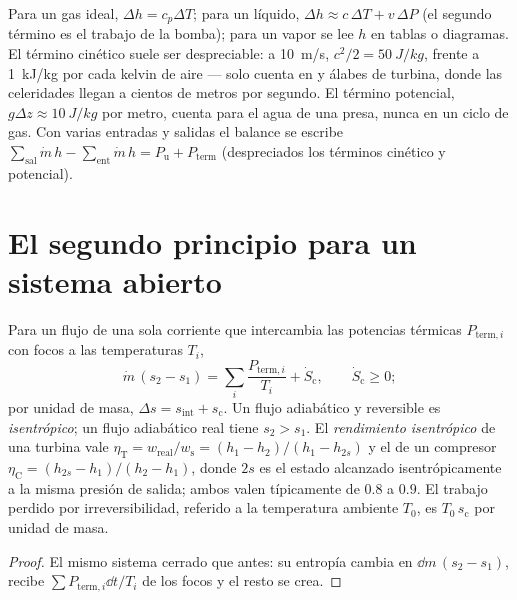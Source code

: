 \begin{remark}\label{rem:b2:open-systems:using}
Para un gas ideal, $\Delta h = c_p\Delta T$; para un líquido, $\Delta h \approx
c\,\Delta T + v\,\Delta P$ (el segundo término es el trabajo de la bomba); para un vapor
se lee $h$ en tablas o diagramas. El término cinético suele ser
despreciable: a \qty{10}{m/s}, $c^2/2 = \qty{50}{J/kg}$, frente a
\qty{1}{kJ/kg} por cada kelvin de aire --- solo cuenta en  y
álabes de turbina, donde las celeridades llegan a cientos de metros por segundo. El
término potencial, $g\Delta z \approx \qty{10}{J/kg}$ por metro, cuenta para el
agua de una presa, nunca en un ciclo de gas. Con varias entradas y salidas
el balance se escribe $\sum_{\text{sal}}\dot m\,h - \sum_{\text{ent}}\dot m\,h =
P_{\text{u}} + P_{\text{term}}$ (despreciados los términos cinético y potencial).
\end{remark}

\section{El segundo principio para un sistema abierto}

\begin{theorem}\label{thm:b2:open-systems:secondlaw}
Para un flujo  de una sola corriente que intercambia las potencias térmicas
$P_{\text{term},i}$ con focos a las temperaturas $T_i$,
\[
\dot m\,(s_2 - s_1) = \sum_i\frac{P_{\text{term},i}}{T_i} + \dot S_{\text{c}},
\qquad \dot S_{\text{c}} \ge 0 ;
\]
por unidad de masa, $\Delta s = s_{\text{int}} + s_{\text{c}}$. Un flujo adiabático
y reversible es \emph{isentrópico}; un flujo adiabático real tiene $s_2 >
s_1$. El \emph{rendimiento isentrópico} de
una turbina vale $\eta_{\text{T}} = w_{\text{real}}/w_{\text{s}} = (h_1 - h_2)/(h_1
- h_{2s})$ y el de un compresor $\eta_{\text{C}} = (h_{2s} - h_1)/(h_2 -
h_1)$, donde $2s$ es el estado alcanzado isentrópicamente a la misma
presión de salida; ambos valen típicamente de $0.8$ a $0.9$. El trabajo perdido por
irreversibilidad, referido a la temperatura ambiente $T_0$, es
$T_0\,s_{\text{c}}$ por unidad de masa.
\end{theorem}

\begin{proof}
El mismo sistema cerrado que antes: su entropía cambia en $\dd m\,(s_2 -
s_1)$, recibe $\sum P_{\text{term},i}\dd t/T_i$ de los focos y el
resto se crea.
\end{proof}

